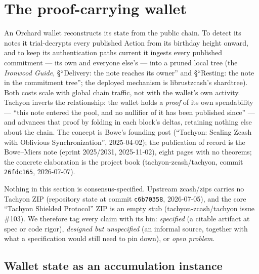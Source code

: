 \documentclass[11pt,a4paper]{article}
\theoremstyle{definition}
\begin{document}
\section{The proof-carrying wallet}\label{sec:tachyon-architecture}

An Orchard wallet reconstructs its state from the public chain. To detect its
notes it trial-decrypts every published Action from its birthday height
onward, and to keep its authentication paths current it ingests every
published commitment --- its own and everyone else's --- into a pruned local
tree (the \emph{Ironwood Guide}, \S``Delivery: the note reaches its owner'' and
\S``Resting: the note in the commitment tree''; the deployed
mechanism is librustzcash's \textsf{shardtree}). Both costs scale with global
chain traffic, not with the wallet's own activity. Tachyon inverts the
relationship: the wallet holds a \emph{proof} of its own spendability ---
``this note entered the pool, and no nullifier of it has been published
since'' --- and advances that proof by folding in each block's deltas,
retaining nothing else about the chain. The concept is Bowe's founding post
(``Tachyon: Scaling Zcash with Oblivious Synchronization'', 2025-04-02); the
publication of record is the Bowe--Miers note (eprint 2025/2031, 2025-11-02),
eight pages with no theorems; the concrete elaboration is the project book
(tachyon-zcash/tachyon, commit \texttt{26fdc165}, 2026-07-07).

Nothing in this section is consensus-specified. Upstream zcash/zips carries
no Tachyon ZIP (repository state at commit \texttt{c6b70358}, 2026-07-05),
and the core ``Tachyon Shielded Protocol'' ZIP is an empty stub
(tachyon-zcash/tachyon issue \#103). We therefore tag every claim with its
bin: \emph{specified} (a citable artifact at spec or code rigor),
\emph{designed but unspecified} (an informal source, together with what a
specification would still need to pin down), or \emph{open problem}.

\subsection{Wallet state as an accumulation instance}\label{sec:tachyon-fold}
\end{document}
